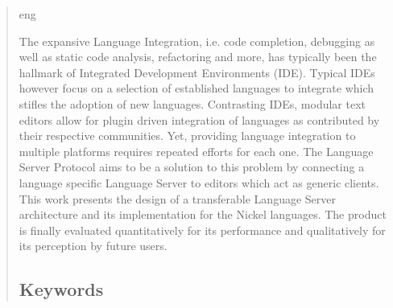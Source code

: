 \documentclass[
  a4paper,
  bibtex,
  english,
  nomenclature]{kthlatex/kththesis/kththesis}
\author{}
\date{}
\begin{document}

\kthcover
\clearpage

\thispagestyle{empty}\mbox{}

\titlepage

\bookinfopage

\setcounter{page}{1}
\begin{abstract}
  \markboth{\abstractname}{}

\begin{scontents}[store-env=lang]
eng
\end{scontents}

\begin{scontents}[store-env=abstracts,print-env=true]

The expansive Language Integration, i.e. code completion, debugging as well as static code analysis, refactoring and more, has typically been the hallmark of Integrated Development Environments (IDE).
Typical IDEs however focus on a selection of established languages to integrate which stifles the adoption of new languages.
Contrasting IDEs, modular text editors allow for plugin driven integration of languages as contributed by their respective communities.
Yet, providing language integration to multiple platforms requires repeated efforts for each one.
The Language Server Protocol aims to be a solution to this problem by connecting a language specific Language Server to editors which act as generic clients.
This work presents the design of a transferable Language Server architecture and its implementation for the Nickel languages.
The product is finally evaluated quantitatively for its performance and qualitatively for its perception by future users.

\end{scontents}

\subsection*{Keywords}
\begin{scontents}[store-env=keywords,print-env=true]
\end{scontents}
\end{abstract}
\cleardoublepage
\end{document}
